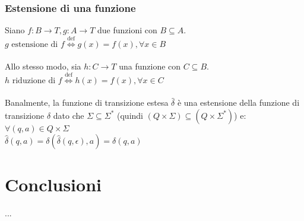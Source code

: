 \documentclass[]{article}
\begin{document}
\subsubsection{Estensione di una funzione}
Siano \mbox{$f \colon B \to T, g \colon A \to T$} due funzioni con \mbox{$ B \subseteq A $}.
\\
\mbox{$ g \text{ estensione di } f \overset{\text{def}}{\Leftrightarrow} g(x) = f(x), \forall x \in B $}
\\
\\
Allo stesso modo, sia \mbox{$h \colon C \to T$} una funzione con \mbox{$ C \subseteq B $}.
\\
\mbox{$ h \text{ riduzione di } f \overset{\text{def}}{\Leftrightarrow} h(x) = f(x), \forall x \in C $}
\\
\\
Banalmente, la funzione di transizione estesa \mbox{$ \hat\delta $} è una estensione della funzione di
transizione \mbox{$ \delta $} dato che \mbox{$ \Sigma \subseteq \Sigma^* $}
(quindi \mbox{$ (Q \times \Sigma) \subseteq (Q \times \Sigma^*) $}) e:
\\
\mbox{$ \forall (q, a) \in Q \times \Sigma $}
\\
\mbox{$ \hat\delta(q, a) = \delta(\hat\delta(q, \epsilon), a) = \delta(q, a) $}



\newpage
\section*{Conclusioni}

...
\end{document}
